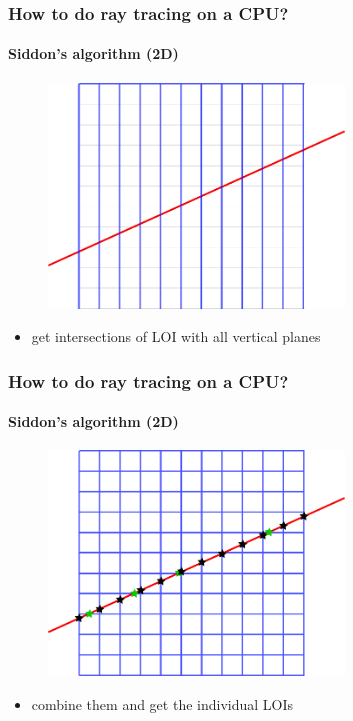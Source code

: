 \documentclass{beamer}
\begin{document}
\begin{frame}
  \frametitle{How to do ray tracing on a CPU?}
  \framesubtitle{Siddon's algorithm (2D)}
  \begin{figure}
    \centering
    \includegraphics[width = 0.7\textwidth]{../Vertical.pdf}
  \end{figure}
  \begin{itemize}
    \item get intersections of LOI with all vertical planes
  \end{itemize}
\end{frame}

\begin{frame}
  \frametitle{How to do ray tracing on a CPU?}
  \framesubtitle{Siddon's algorithm (2D)}
  \begin{figure}
    \centering
    \includegraphics[width = 0.7\textwidth]{../SiddonTraced.pdf}
  \end{figure}
  \begin{itemize}
    \item combine them and get the individual LOIs
  \end{itemize}
\end{frame}
\end{document}

